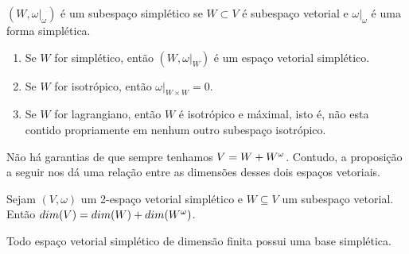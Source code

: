 \documentclass{beamer}
\begin{document}
	\begin{frame}
		\begin{definicao}
			$(W, \omega|_{\omega})$ é um subespaço simplético se $W\subset V$ é subespaço vetorial e
			 $\omega|_{\omega}$ é uma forma simplética.
		\end{definicao}
		\begin{lema}
			\begin{enumerate}
				\item Se $W$ for simplético, então $(W, \omega|_{W})$ é um espaço vetorial simplético.
				
				\item Se $W$ for isotrópico, então $\omega|_{W\times W} = 0$.
				
				\item Se $W$ for lagrangiano, então $W$ é isotrópico e máximal, isto é, não esta contido propriamente em nenhum outro subespaço isotrópico.
			\end{enumerate}
		\end{lema}
		Não há garantias de que sempre tenhamos $V = W + W^{\omega}$. Contudo, a proposição a seguir nos dá uma relação entre as dimensões desses dois espaços vetoriais.
		
	\end{frame}
	
	\begin{frame}
		
		\begin{proposicao}
			Sejam $(V,\omega)$ um 2-espaço vetorial simplético e $W \subseteq V$ um subespaço vetorial. Então $dim(V) = dim(W) + dim(W^{\omega})$.
		\end{proposicao}
		
		\pause
		\begin{teorema}
			Todo espaço vetorial simplético de dimensão finita possui uma base simplética.
		\end{teorema}
	\end{frame}
	
\end{document}
